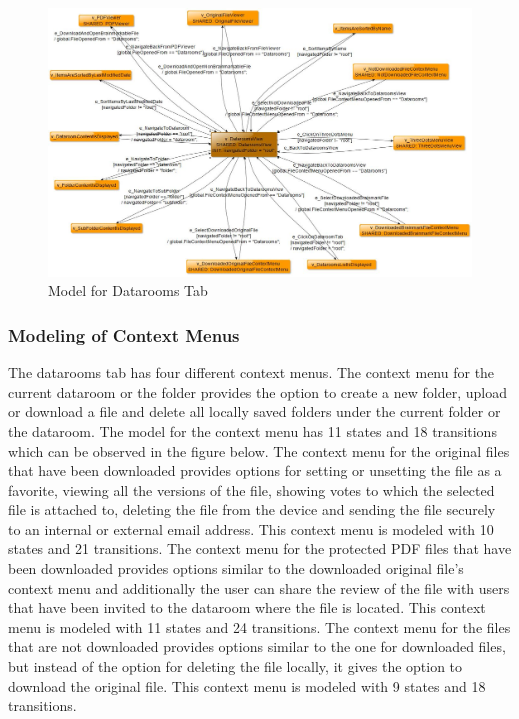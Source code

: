 \begin{figure} [htbp!]
	\centering
					\includegraphics[width=1\textwidth]{figures/Datarooms_model_screenshot}
					\caption{\label{Fig:Datarooms_Model_Screenshot} Model for Datarooms Tab}
\end{figure}

\subsubsection{Modeling of Context Menus}
\par
The datarooms tab has four different context menus. The context menu for the current dataroom or the folder provides the option to create a new folder, upload or download a file and delete all locally saved folders under the current folder or the dataroom. The model for the context menu has 11 states and 18 transitions which can be observed in the figure below. The context menu for the original files that have been downloaded provides options for setting or unsetting the file as a favorite, viewing all the versions of the file, showing votes to which the selected file is attached to, deleting the file from the device and sending the file securely to an internal or external email address. This context menu is modeled with 10 states and 21 transitions. The context menu for the protected PDF files that have been downloaded provides options similar to the downloaded original file's context menu and additionally the user can share the review of the file with users that have been invited to the dataroom where the file is located. This context menu is modeled with 11 states and 24 transitions. The context menu for the files that are not downloaded provides options similar to the one for downloaded files, but instead of the option for deleting the file locally, it gives the option to download the original file. This context menu is modeled with 9 states and 18 transitions.


